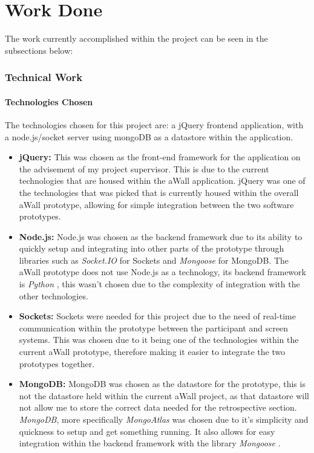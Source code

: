\chapter{Work Done}\label{C:workdone}
The work currently accomplished within the project can be seen in the subsections below:
\subsection{Technical Work}
\subsubsection{Technologies Chosen}
The technologies chosen for this project are: a jQuery frontend application, with a node.js/socket server using mongoDB as a datastore within the application. 
\begin{itemize}
\item \textbf{jQuery:} \cite{js.foundation_2018}  This was chosen as the front-end framework for the application on the advisement of my project supervisor. This is due to the current technologies that are housed within the aWall application. jQuery was one of the technologies that was picked that is currently housed within the overall aWall prototype, allowing for simple integration between the two software prototypes. 
\item \textbf{Node.js:} \cite{foundation_2018} Node.js was chosen as the backend framework due to its ability to quickly setup and integrating into other parts of the prototype through libraries such as \textit{Socket.IO} \cite{socket.io_2018} for Sockets and \textit{Mongoose} \cite{mongoose-odm-v5.1.3_2018} for MongoDB. The aWall prototype does not use Node.js as a technology, its backend framework is \textit{Python} \cite{welcome-to-python.org_2018}, this wasn't chosen due to the complexity of integration with the other technologies. 
\item \textbf{Sockets:} \cite{socket.io_2018} Sockets were needed for this project due to the need of real-time communication within the prototype between the participant and screen systems. This was chosen due to it being one of the technologies within the current aWall prototype, therefore making it easier to integrate the two prototypes together.
\item \textbf{MongoDB:} \cite{mongodb-for-giant-ideas_2018} MongoDB was chosen as the datastore for the prototype, this is not the datastore held within the current aWall project, as that datastore will not allow me to store the correct data needed for the retrospective section. \textit{MongoDB}, more specifically \textit{MongoAtlas} \cite{fully-managed-mongodb-hosted-on-aws-azure-and-gcp_2018} was chosen due to it's simplicity and quickness to setup and get something running. It also allows for easy integration within the backend framework with the library \textit{Mongoose} \cite{mongoose-odm-v5.1.3_2018}.
\end{itemize}
